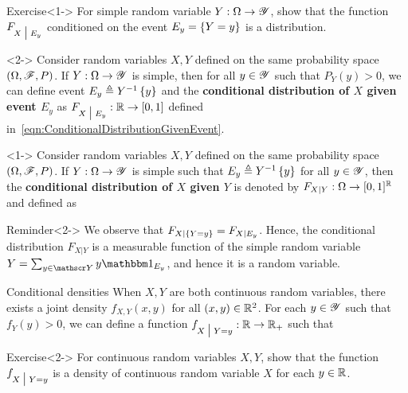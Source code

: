 \documentclass[12pt,aspectratio=169]{beamer}
\begin{document}
\begin{frame}
\begin{block}{Exercise}<1-> 
For simple random variable $Y: \Omega \to \mathscr{Y}$, 
show that the function $F_{X\; \big\vert \; E_y}$ conditioned on the event $E_y = \left\{Y=y\right\}$ is a distribution. 
\end{block}

\begin{Definition}<2->
Consider random variables $X,Y$ defined on the same probability space $(\Omega, \mathscr{F}, P)$. 
If $Y: \Omega \to \mathscr{Y}$ is simple, 
then for all $y \in \mathscr{Y}$ such that $P_Y(y) > 0$, 
we can define event $E_y \triangleq Y^{-1}\left\{y\right\}$ and the \textbf{conditional distribution of $X$ given event $E_y$} as $F_{X \; \big\vert \; E_y}: \mathbb{R} \to [0,1]$ defined in~\eqref{eqn:ConditionalDistributionGivenEvent}.
\end{Definition}
\end{frame}

\begin{frame}
\begin{Definition}<1->
Consider random variables $X, Y$ defined on the same probability space $(\Omega, \mathscr{F}, P)$. 
If $Y:\Omega\to\mathscr{Y}$ is simple such that $E_y \triangleq Y^{-1}\left\{y\right\}$ for all $y \in \mathscr{Y}$, 
then the \textbf{conditional distribution of $X$ given $Y$} is denoted by $F_{X|Y}: \Omega \to [0,1]^{\mathbb{R}}$ and defined as 
\end{Definition}

\begin{block}{Reminder}<2->
We observe that $F_{X|\left\{Y=y\right\}} = F_{X|E_y}$. 
Hence, the conditional distribution $F_{X|Y}$ is a measurable function of the simple random variable $Y = \sum_{y\in\sY}y\Ind{E_y}$, 
and hence it is a random variable.
\end{block}
\end{frame}

\begin{frame}{Conditional densities}
When $X, Y$ are both continuous random variables, 
there exists a joint density $f_{X,Y}(x,y)$ for all $(x, y) \in \mathbb{R}^2$. 
For each $y \in \mathscr{Y}$ such that $f_Y(y) > 0$, we can define a function $f_{X\; \big\vert \; Y = y}: \mathbb{R} \to \mathbb{R}_+$ such that   


\begin{block}{Exercise}<2->
For continuous random variables $X,Y$, 
show that the function $f_{X\; \big\vert \; Y= y}$ is a density of continuous random variable $X$ for each $y\in \mathbb{R}$. 
\end{block}
\end{frame}
\end{document}
